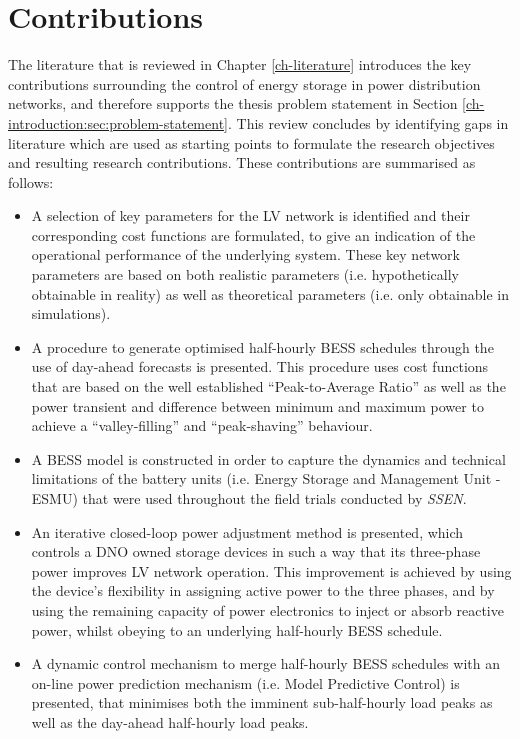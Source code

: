 \section{Contributions}
\label{ch-introduction:sec:contributions}

The literature that is reviewed in Chapter \ref{ch-literature} introduces the key contributions surrounding the control of energy storage in power distribution networks, and therefore supports the thesis problem statement in Section \ref{ch-introduction:sec:problem-statement}.
This review concludes by identifying gaps in literature which are used as starting points to formulate the research objectives and resulting research contributions.
These contributions are summarised as follows:

\begin{itemize}
	\item
	A selection of key parameters for the LV network is identified and their corresponding cost functions are formulated, to give an indication of the operational performance of the underlying system.
	These key network parameters are based on both realistic parameters (i.e. hypothetically obtainable in reality) as well as theoretical parameters (i.e. only obtainable in simulations).
	\item
	A procedure to generate optimised half-hourly BESS schedules through the use of day-ahead forecasts is presented.
	This procedure uses cost functions that are based on the well established ``Peak-to-Average Ratio'' as well as the power transient and difference between minimum and maximum power to achieve a ``valley-filling'' and ``peak-shaving'' behaviour.
	\item
	A BESS model is constructed in order to capture the dynamics and technical limitations of the battery units (i.e. Energy Storage and Management Unit - ESMU) that were used throughout the field trials conducted by \textit{SSEN}.
	\item
	An iterative closed-loop power adjustment method is presented, which controls a DNO owned storage devices in such a way that its three-phase power improves LV network operation.
	This improvement is achieved by using the device's flexibility in assigning active power to the three phases, and by using the remaining capacity of power electronics to inject or absorb reactive power, whilst obeying to an underlying half-hourly BESS schedule.
	\item
	A dynamic control mechanism to merge half-hourly BESS schedules with an on-line power prediction mechanism (i.e. Model Predictive Control) is presented, that minimises both the imminent sub-half-hourly load peaks as well as the day-ahead half-hourly load peaks.

\end{itemize}
